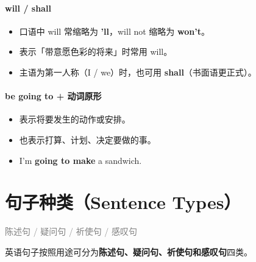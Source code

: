 \documentclass[11pt,a4paper]{ctexart}
\begin{document}
\paragraph{will / shall}

\begin{itemize}[leftmargin=1.4em]
\item 口语中 will 常缩略为 \textbf{’ll}，will not 缩略为 \textbf{won’t}。
\item 表示「带意愿色彩的将来」时常用 will。
\item 主语为第一人称（I / we）时，也可用 \textbf{shall}（书面语更正式）。
\end{itemize}

\paragraph{be going to + 动词原形}

\begin{itemize}[leftmargin=1.4em]
\item 表示将要发生的动作或安排。
\item 也表示打算、计划、决定要做的事。
\item I’m \textbf{going to make} a sandwich.
\end{itemize}

\begin{center}\end{center}

\section{句子种类（Sentence Types）}
\noindent\textcolor{gray}{陈述句 / 疑问句 / 祈使句 / 感叹句}\par\smallskip
英语句子按照用途可分为\textbf{陈述句、疑问句、祈使句和感叹句}四类。
\end{document}
